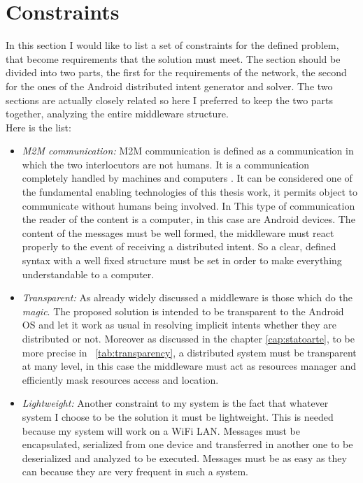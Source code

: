 \section{Constraints} \label{problemconstraints}
In this section I would like to list a set of  constraints for the defined problem, that become requirements that the solution must meet. The section should be divided into two parts, the first for the requirements of the network, the second for the ones of the Android distributed intent generator and solver. The two sections are actually closely related so here I preferred to keep the two parts together, analyzing the entire middleware structure.\\ 
Here is the list:

\begin{itemize}
	\item \textit{M2M communication:} M2M communication is defined as a communication in which the two interlocutors are not humans. It is a communication completely handled by machines and computers \cite{cha2009trust}. It can be considered one of the fundamental enabling technologies of this thesis work, it permits object to communicate without humans being involved. In This type of communication the reader of the content is a computer, in this case are Android devices. The content of the messages must be well formed, the middleware must react properly to the event of receiving a distributed intent. So a clear, defined syntax with a well fixed structure  must be set in order to make everything understandable to a computer.
	
	\item \textit{Transparent:} As already widely discussed a middleware is those which do the \textit{magic}. The proposed solution is intended to be transparent to the Android OS and let it work as usual in resolving implicit intents whether they are distributed or not. Moreover as discussed in the chapter \ref{cap:statoarte}, to be more precise in \tablename~\ref{tab:transparency}, a distributed system must be transparent at many level, in this case the middleware must act as resources manager and efficiently mask resources access and location.
	
	
	\item \textit{Lightweight:} Another constraint to my system is the fact that whatever system I choose to be the solution it must be lightweight. This is needed because my system will work on a WiFi LAN. Messages must be encapsulated, serialized from one device and transferred in another one to be deserialized and analyzed to be executed. Messages must be as easy as they can because they are very frequent in such a system.
	

\end{itemize}
